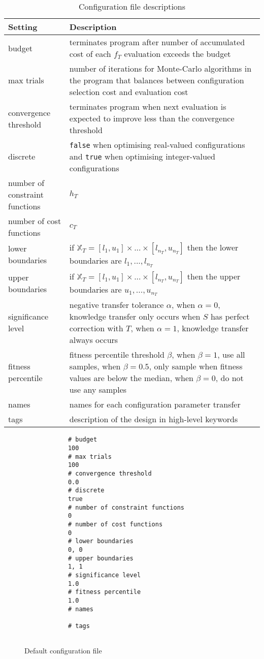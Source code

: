 \documentclass[10pt,a4paper]{article}
\begin{document}
\noindent
\begin{table}[H]
	\begin{tabularx}{\linewidth}{l X}
		\hline
		Setting & Description\\
		\hline
		budget & terminates program after number of accumulated cost of each $f_T$ evaluation exceeds the budget\\
		max trials & number of iterations for Monte-Carlo algorithms in the program that balances between configuration selection cost and evaluation cost\\
		convergence threshold & terminates program when next evaluation is expected to improve less than the convergence threshold\\
		discrete & \verb|false| when optimising real-valued configurations and \verb|true| when optimising integer-valued configurations\\
		number of constraint functions & $h_T$\\
		number of cost functions & $c_T$\\
		lower boundaries & if $\mathbb{X}_T=[l_1,u_1]\times...\times[l_{n_T},u_{n_T}]$ then the lower boundaries are $l_1,...,l_{n_T}$\\
		upper boundaries & if $\mathbb{X}_T=[l_1,u_1]\times...\times[l_{n_T},u_{n_T}]$ then the upper boundaries are $u_1,...,u_{n_T}$\\
		significance level & negative transfer tolerance $\alpha$, when $\alpha=0$, knowledge transfer only occurs when $S$ has perfect correction with $T$, when $\alpha=1$, knowledge transfer always occurs\\
		fitness percentile & fitness percentile threshold $\beta$, when $\beta=1$, use all samples, when $\beta=0.5$, only sample when fitness values are below the median, when $\beta=0$, do not use any samples\\
		names & names for each configuration parameter transfer\\
		tags & description of the design in high-level keywords\\
		\hline
	\end{tabularx}
	\caption{Configuration file descriptions}
\end{table}

\begin{figure}[H]
	\begin{framed}
		\begin{verbatim}
			# budget
			100
			# max trials
			100
			# convergence threshold
			0.0
			# discrete
			true
			# number of constraint functions
			0
			# number of cost functions
			0
			# lower boundaries
			0, 0
			# upper boundaries
			1, 1
			# significance level
			1.0
			# fitness percentile
			1.0
			# names
			
			# tags
			
		\end{verbatim}
	\end{framed}
	\caption{Default configuration file}
\end{figure}
\end{document}
